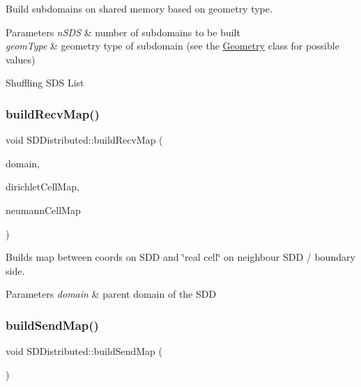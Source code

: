 Build subdomains on shared memory based on geometry type. 


\begin{DoxyParams}{Parameters}
{\em n\+S\+DS} & number of subdomains to be built \\
\hline
{\em geom\+Type} & geometry type of subdomain (see the \mbox{\hyperlink{classGeometry}{Geometry}} class for possible values) \\
\hline
\end{DoxyParams}
Shuffling S\+DS List \mbox{\label{classSDDistributed_a55650dabf89c711ac07e5795e1b87b17}} 
\subsubsection{\texorpdfstring{build\+Recv\+Map()}{buildRecvMap()}}
{\footnotesize\ttfamily void S\+D\+Distributed\+::build\+Recv\+Map (\begin{DoxyParamCaption}\item[{const \mbox{\hyperlink{classDomain}{Domain}} \&}]{domain,  }\item[{std\+::map$<$ std\+::pair$<$ int, int $>$, real $>$ \&}]{dirichlet\+Cell\+Map,  }\item[{std\+::map$<$ std\+::pair$<$ int, int $>$, std\+::pair$<$ int, int $>$ $>$ \&}]{neumann\+Cell\+Map }\end{DoxyParamCaption})}



Builds map between coords on S\+DD and \char`\"{}real cell\char`\"{} on neighbour S\+DD / boundary side. 


\begin{DoxyParams}{Parameters}
{\em domain} & parent domain of the S\+DD \\
\hline
\end{DoxyParams}
\mbox{\label{classSDDistributed_a32d97f1dcac80c2f61124460149fb0fb}} 
\subsubsection{\texorpdfstring{build\+Send\+Map()}{buildSendMap()}}
{\footnotesize\ttfamily void S\+D\+Distributed\+::build\+Send\+Map (\begin{DoxyParamCaption}{ }\end{DoxyParamCaption})}



